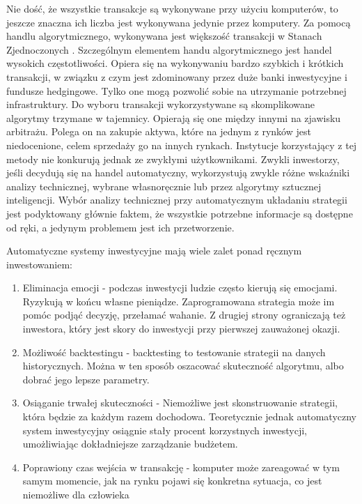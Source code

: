 \documentclass[twoside]{iisthesis}
\begin{document}
Nie dość, że wszystkie transakcje są wykonywane przy użyciu komputerów, to jeszcze znaczna ich liczba jest wykonywana jedynie przez komputery. Za pomocą handlu algorytmicznego, wykonywana jest większość transakcji w Stanach Zjednoczonych \cite{algorythmicTradingInvestopedia}. Szczególnym elementem handu algorytmicznego jest handel wysokich częstotliwości. Opiera się na wykonywaniu bardzo szybkich i krótkich transakcji, w związku z czym jest zdominowany przez duże banki inwestycyjne i fundusze hedgingowe. Tylko one mogą pozwolić sobie na utrzymanie potrzebnej infrastruktury. Do wyboru transakcji wykorzystywane są skomplikowane algorytmy trzymane w tajemnicy. Opierają się one między innymi na zjawisku arbitrażu. Polega on na zakupie aktywa, które na jednym z rynków jest niedocenione, celem sprzedaży go na innych rynkach. Instytucje korzystający z tej metody nie konkurują jednak ze zwykłymi użytkownikami. Zwykli inwestorzy, jeśli decydują się na handel automatyczny, wykorzystują zwykle różne wskaźniki analizy technicznej, wybrane własnoręcznie lub przez algorytmy sztucznej inteligencji. Wybór analizy technicznej przy automatycznym układaniu strategii jest podyktowany głównie faktem, że wszystkie potrzebne informacje są dostępne od ręki, a jedynym problemem jest ich przetworzenie. 

Automatyczne systemy inwestycyjne mają wiele zalet ponad ręcznym inwestowaniem:

\begin{enumerate}
\item Eliminacja emocji - podczas inwestycji ludzie często kierują się emocjami. Ryzykują w końcu własne pieniądze. Zaprogramowana strategia może im pomóc podjąć decyzję, przełamać wahanie. Z drugiej strony ograniczają też inwestora, który jest skory do inwestycji przy pierwszej zauważonej okazji.
\item Możliwość backtestingu - backtesting to testowanie strategii na danych historycznych. Można w ten sposób oszacować skuteczność algorytmu, albo dobrać jego lepsze parametry.
\item Osiąganie trwałej skuteczności - Niemożliwe jest skonstruowanie strategii, która będzie za każdym razem dochodowa. Teoretycznie jednak automatyczny system inwestycyjny osiągnie stały procent korzystnych inwestycji, umożliwiając dokładniejsze zarządzanie budżetem.
\item Poprawiony czas wejścia w transakcję - komputer może zareagować w tym samym momencie, jak na rynku pojawi się konkretna sytuacja, co jest niemożliwe dla człowieka
\end{enumerate}
\end{document}
